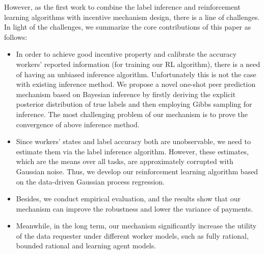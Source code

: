 However, as the first work to combine the label inference and reinforcement learning algorithms with incentive mechanism design, there is a line of challenges. In light of the challenges, we summarize the core contributions of this paper as follows:
\begin{itemize}
\item In order to achieve good incentive property and calibrate the accuracy workers' reported information (for training our RL algorithm), there is a need of having an unbiased inference algorithm. Unfortunately this is not the case with existing inference method. We propose a novel one-shot peer prediction mechanism based on Bayesian inference by firstly deriving the explicit posterior distribution of true labels and then employing Gibbs sampling for inference. The most challenging problem of our mechanism is to prove the convergence of above inference method.
\item Since workers' states and label accuracy both are unobservable, we need to estimate them via the label inference algorithm. However, these estimates, which are the means over all tasks, are approximately corrupted with Gaussian noise. Thus, we develop our reinforcement learning algorithm based on the data-driven Gaussian process regression.
%
%
\item Besides, we conduct empirical evaluation, and the results show that our mechanism can improve the robustness and lower the variance of payments.
\item Meanwhile, in the long term, our mechanism significantly increase the utility of the data requester under different worker models, such as fully rational, bounded rational and learning agent models. 
\end{itemize}


